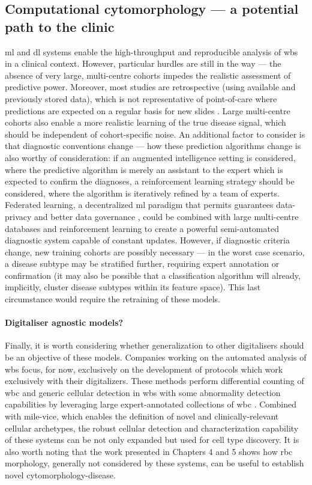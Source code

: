 \subsection{Computational cytomorphology --- a potential path to the clinic} 

\Ac{ml} and \ac{dl} systems enable the high-throughput and reproducible analysis of \ac{wbs} in a clinical context. However, particular hurdles are still in the way --- the absence of very large, multi-centre cohorts impedes the realistic assessment of predictive power. Moreover, most studies are retrospective (using available and previously stored data), which is not representative of point-of-care where predictions are expected on a regular basis for new slides \cite{Eckardt2020-fp}. Large multi-centre cohorts also enable a more realistic learning of the true disease signal, which should be independent of cohort-specific noise. An additional factor to consider is that diagnostic conventions change --- how these prediction algorithms change is also worthy of consideration: if an augmented intelligence setting is considered, where the predictive algorithm is merely an assistant to the expert which is expected to confirm the diagnoses, a reinforcement learning strategy should be considered, where the algorithm is iteratively refined by a team of experts. Federated learning, a decentralized \ac{ml} paradigm that permits guarantees data-privacy and better data governance \cite{Rieke2020-hl}, could be combined with large multi-centre databases and reinforcement learning to create a powerful semi-automated diagnostic system capable of constant updates. However, if diagnostic criteria change, new training cohorts are possibly necessary --- in the worst case scenario, a disease subtype may be stratified further, requiring expert annotation or confirmation (it may also be possible that a classification algorithm will already, implicitly, cluster disease subtypes within its feature space). This last circumstance would require the retraining of these models.

\paragraph{Digitaliser agnostic models?} Finally, it is worth considering whether generalization to other digitalisers should be an objective of these models. Companies working on the automated analysis of \ac{wbs} focus, for now, exclusively on the development of protocols which work exclusively with their digitalizers. These methods perform differential counting of \ac{wbc} and generic cellular detection in \ac{wbs} with some abnormality detection capabilities by leveraging large expert-annotated collections of \ac{wbc} \cite{cellavision,advia-120}. Combined with \ac{mile-vice}, which enables the definition of novel and clinically-relevant cellular archetypes, the robust cellular detection and characterization capability of these systems can be not only expanded but used for cell type discovery. It is also worth noting that the work presented in Chapters 4 and 5 shows how \ac{rbc} morphology, generally not considered by these systems, can be useful to establish novel cytomorphology-disease. 

